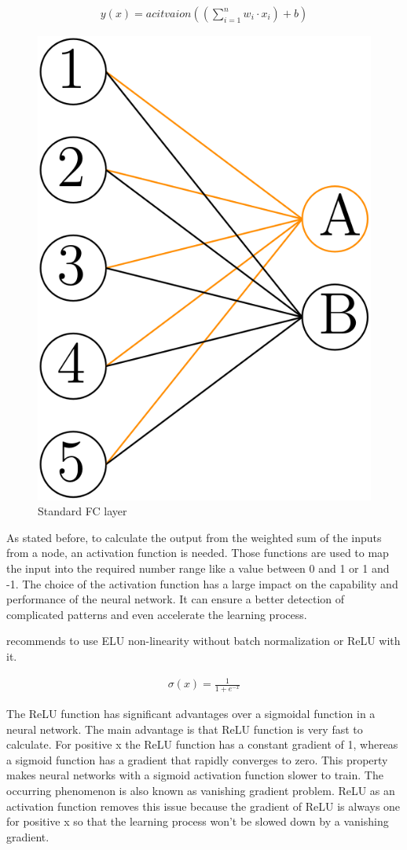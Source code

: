 \documentclass[
a4paper, 
12pt,
grayscalebody, %
abstract=on,
twoside, BCOR10mm, 12pt, DIV13,headinclude, footexclude, final, abstracton, openright
]{ibireprt}
\numberwithin{equation}{chapter}
\numberwithin{table}{chapter}
\numberwithin{figure}{chapter}
\numberwithin{algorithm}{chapter}
\numberwithin{example}{chapter}
\numberwithin{example}{chapter}
\begin{document}
\begin{align}
	y(x)=acitvaion((\sum_{i=1}^{n}w_i\cdot x_i)+b)
\end{align}

\begin{figure}[h]
	\centering
	\includegraphics[width =0.25 \textwidth]{Dense_layer.png}%
	\caption{Standard FC layer}
	\label{fig:fig_fc_layer}
\end{figure}


As stated before, to calculate the output from the weighted sum of the inputs from a node, an activation function is needed. Those functions are used to map the input into the required number range like a value between 0 and 1 or 1 and -1. The choice of the activation function has a large impact on the capability and performance of the neural network. It can ensure a better detection of complicated patterns and even accelerate the learning process. \cite{Khan2020} 

\cite{Mishkin2017} recommends to use ELU non-linearity without batch normalization or ReLU with it.

\begin{align}
	\sigma (x)= \frac{1}{1+e^{-x}}
\end{align}

The ReLU function has significant advantages over a sigmoidal function in a neural network. The main advantage is that ReLU function is very fast to calculate. For positive x the ReLU function has a constant gradient of 1, whereas a sigmoid function has a gradient that rapidly converges to zero. This property makes neural networks with a sigmoid activation function slower to train. The occurring phenomenon is also known as vanishing gradient problem. %
ReLU as an activation function removes this issue because the gradient of ReLU is always one for positive x so that the learning process won't be slowed down by a vanishing gradient. 
\end{document}
